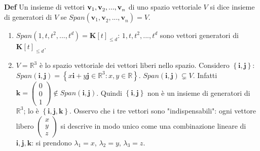 \documentclass{article}
\begin{document}
\textbf{Def} Un insieme di vettori $\mathbf{v}_{1}\mathbf{,v}_{2}\mathbf{%
,...,v}_{n}$ di uno spazio vettoriale $V$ si dice insieme di generatori di $%
V $ se $Span\left( \mathbf{v}_{1}\mathbf{,v}_{2}\mathbf{,...,v}_{n}\right)
=V $.

\begin{enumerate}
\item $Span\left( 1,t,t^{2},...,t^{d}\right) =\mathbf{K}\left[ t\right]
_{\leq d}$: $1,t,t^{2},...,t^{d}$ sono vettori generatori di $\mathbf{K}%
\left[ t\right] _{\leq d}$.

\item $V=%
\mathbb{R}
^{3}$ \`{e} lo spazio vettoriale dei vettori liberi nello spazio. Considero $%
\left\{ \mathbf{i,j}\right\} $: $Span\left( \mathbf{i,j}\right) =\left\{ x%
\mathbf{i}+y\mathbf{j}\in 
\mathbb{R}
^{3}:x,y\in 
\mathbb{R}
\right\} $. $Span\left( \mathbf{i,j}\right) \varsubsetneq V$. Infatti $%
\mathbf{k}=\left( 
\begin{array}{c}
0 \\ 
0 \\ 
1%
\end{array}%
\right) \notin Span\left( \mathbf{i,j}\right) $. Quindi $\left\{ \mathbf{i,j}%
\right\} $ non \`{e} un insieme di generatori di $%
\mathbb{R}
^{3}$; lo \`{e} $\left\{ \mathbf{i,j,k}\right\} $. Osservo che i tre vettori
sono "indispensabili": ogni vettore libero $\left( 
\begin{array}{c}
x \\ 
y \\ 
z%
\end{array}%
\right) $ si descrive in modo unico come una combinazione lineare di $%
\mathbf{i,j,k}$: si prendono $\lambda _{1}=x$, $\lambda _{2}=y$, $\lambda
_{3}=z$.


\end{enumerate}
\end{document}
